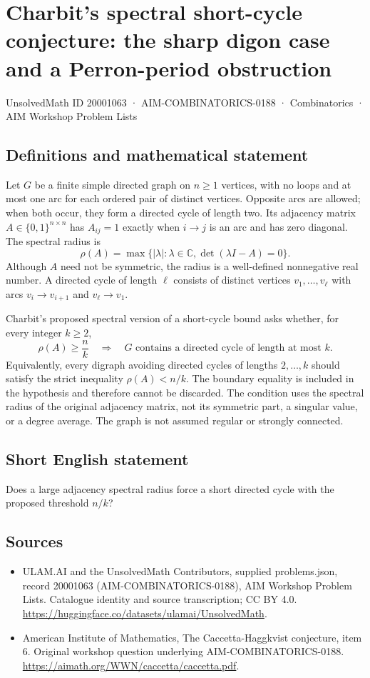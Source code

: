 \documentclass[11pt,a4paper]{article}
\begin{document}
\section*{Charbit's spectral short-cycle conjecture: the sharp digon case and a Perron-period obstruction}\label{20001063}
{\small UnsolvedMath ID 20001063 · AIM-COMBINATORICS-0188 · Combinatorics · AIM Workshop Problem Lists}
\subsection{Definitions and mathematical statement}
Let $G$ be a finite simple directed graph on $n\geq1$ vertices, with no loops and at most one arc for each ordered pair of distinct vertices.
Opposite arcs are allowed; when both occur, they form a directed cycle of length two.
Its adjacency matrix $A\in\{0,1\}^{n\times n}$ has $A_{ij}=1$ exactly when $i\to j$ is an arc and has zero diagonal.
The spectral radius is
\[
 \rho(A)=\max\{|\lambda|:\lambda\in\mathbb C,
                       \det(\lambda I-A)=0\}.
\]
Although $A$ need not be symmetric, the radius is a well-defined nonnegative real number.
A directed cycle of length $\ell$ consists of distinct vertices $v_1,\ldots,v_\ell$ with arcs $v_i\to v_{i+1}$ and $v_\ell\to v_1$.

Charbit's proposed spectral version of a short-cycle bound asks whether, for every integer $k\geq2$,
\[
 \rho(A)\geq\frac nk
 \quad\Longrightarrow\quad
 G\text{ contains a directed cycle of length at most }k.
\]
Equivalently, every digraph avoiding directed cycles of lengths $2,\ldots,k$ should satisfy the strict inequality $\rho(A)<n/k$.
The boundary equality is included in the hypothesis and therefore cannot be discarded.
The condition uses the spectral radius of the original adjacency matrix, not its symmetric part, a singular value, or a degree average.
The graph is not assumed regular or strongly connected.
\subsection{Short English statement}
Does a large adjacency spectral radius force a short directed cycle with the proposed threshold $n/k$?
\subsection{Sources}
\begin{itemize}
\item[S1] ULAM.AI and the UnsolvedMath Contributors, supplied problems.json, record 20001063 (AIM-COMBINATORICS-0188), AIM Workshop Problem Lists. Catalogue identity and source transcription; CC BY 4.0.
\url{https://huggingface.co/datasets/ulamai/UnsolvedMath}.
\item[S2] American Institute of Mathematics, The Caccetta-Haggkvist conjecture, item 6. Original workshop question underlying AIM-COMBINATORICS-0188.
\url{https://aimath.org/WWN/caccetta/caccetta.pdf}.
\end{itemize}
\end{document}
